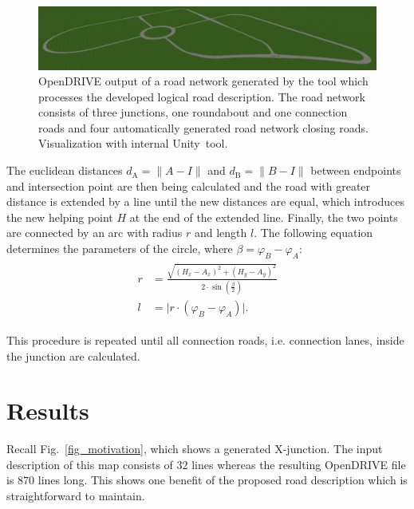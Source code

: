 \documentclass[a4paper, 10pt, conference]{ieeeconf}      %
\begin{document}
\begin{figure}
	\includegraphics[width=\textwidth]{fig/res_huge.PNG}
	\caption[dummy2]{OpenDRIVE output of a road network generated by the tool which processes the developed logical road description. The road network consists of three junctions, one roundabout and one connection roads and four automatically generated road network closing roads. Visualization with internal Unity\footnotemark~tool.}
	\label{fig_resHuge}
\end{figure} %

    The euclidean distances $d_\text{A} = \|A-I\|$ and $d_\text{B} = \|B-I\|$ between endpoints and intersection point are then being calculated and the road with greater distance is extended by a line until the new distances are equal, which introduces the new helping point \(H\) at the end of the extended line. Finally, the two points are connected by an arc with radius \(r\) and length \(l\). The following equation determines the parameters of the circle, where \(\beta = \varphi_B - \varphi_A\):
    \begin{align}
        \begin{split}           
        r &= \frac{\sqrt{\left(H_x - A_x\right)^2 + \left(H_y - A_y\right)^2}}{2 \cdot \sin\left(\frac{\beta}{2}\right)} \\
        l &= \vert r \cdot \left(\varphi_B - \varphi_A\right) \vert \text{.}  
        \end{split}
    \end{align}
    
    This procedure is repeated until all connection roads, i.e. connection lanes, inside the junction are calculated.
   
\section{Results} \label{sec_res}
Recall Fig.~\ref{fig_motivation}, which shows a generated X-junction. The input description of this map consists of $32$ lines whereas the resulting OpenDRIVE file is $870$ lines long. This shows one benefit of the proposed road description which is straightforward to maintain.
\end{document}
